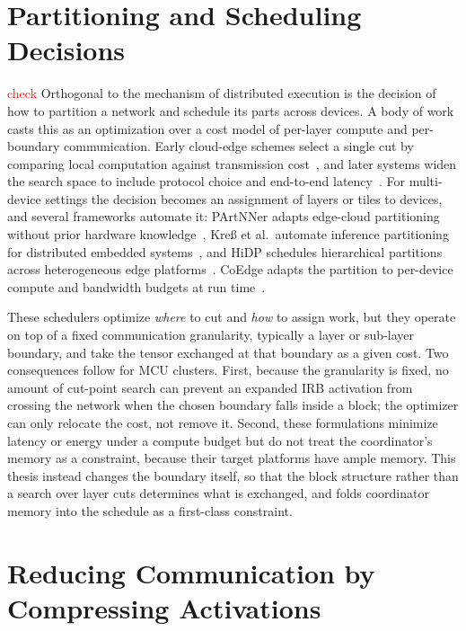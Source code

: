 \section{Partitioning and Scheduling Decisions}
\label{sec:bg-scheduling}
\textcolor{red}{check} Orthogonal to the mechanism of distributed execution is the decision of how to partition a network and schedule its parts across devices. 
A body of work casts this as an optimization over a cost model of per-layer compute and per-boundary communication. Early cloud-edge schemes select a single cut by comparing local computation against transmission cost~\cite{split-neurosurgeon}, and later systems widen the search space to include protocol choice and end-to-end latency~\cite{smartsplit}. For multi-device settings the decision becomes an assignment of layers or tiles to devices, and several frameworks automate it:
PArtNNer adapts edge-cloud partitioning without prior hardware
knowledge~\cite{partnner}, Kre{\ss} et al.\ automate inference partitioning for distributed embedded systems~\cite{kress}, and HiDP schedules hierarchical partitions across heterogeneous edge platforms~\cite{hidp}. 
CoEdge adapts the partition to per-device compute and bandwidth budgets at run time~\cite{coedge}.

These schedulers optimize \emph{where} to cut and \emph{how} to assign work, but they operate on top of a fixed communication granularity, typically a layer or sub-layer boundary, and take the tensor exchanged at that boundary as a given cost. 
Two consequences follow for MCU clusters. First, because the granularity is fixed, no amount of cut-point search can prevent an expanded IRB activation from crossing the network when the chosen boundary falls inside a block; the optimizer can only relocate the cost, not remove it. Second, these formulations minimize latency or energy under a compute budget but do not treat the coordinator's memory as a constraint, because their target platforms have ample memory. 
This thesis instead changes the boundary itself, so that the block structure rather than a search over layer cuts determines what is exchanged, and folds coordinator memory into the schedule as a first-class constraint.

\section{Reducing Communication by Compressing Activations}
\label{sec:bg-compression}

